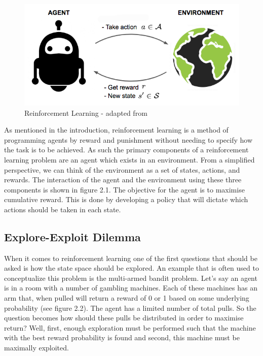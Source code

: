 \begin{figure}[ht]
    \includegraphics[scale=.5]{images/RL_illustration.png}
    \caption{Reinforcement Learning - adapted from\citep{weng2018longpeek}}
\end{figure}

As mentioned in the introduction, reinforcement learning is a method of programming agents by reward and
punishment without needing to specify how the task is to be achieved.
As such the primary components of a reinforcement learning problem are an agent which exists in an environment.
From a simplified perspective, we can think of the environment as a set of states, actions, and rewards.
The interaction of the agent and the environment using these three components is shown in figure 2.1.
The objective for the agent is to maximise cumulative reward.
This is done by developing a policy that will dictate which actions should be taken in each state.

\subsection{Explore-Exploit Dilemma}\label{subsec:exploreExploit}
When it comes to reinforcement learning one of the first questions that should be asked is how the state space should be explored.
An example that is often used to conceptualize this problem is the multi-armed bandit problem.
Let's say an agent is in a room with a number of gambling machines.
Each of these machines has an arm that, when pulled will return a reward of 0 or 1 based on some underlying
probability\citep{kaelbling1996reinforcement} (see figure 2.2).
The agent has a limited number of total pulls.
So the question becomes how should these pulls be distributed in order to maximise return?
Well, first, enough exploration must be performed such that the machine with the best reward probability is found
and second, this machine must be maximally exploited.

